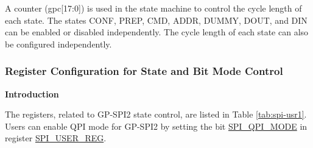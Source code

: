 \documentclass[main\_\_EN.tex]{subfiles}
\begin{document}
A counter (gpc[17:0]) is used in the state machine to control the cycle length of each state. The states CONF, PREP, CMD, ADDR, DUMMY, DOUT, and DIN can be enabled or disabled independently. The cycle length of each state can also be configured independently.

\subsubsection{Register Configuration for State and Bit Mode Control} \label{sec:gp-spi2-state-and-register-configuration}

\textbf{Introduction}

The registers, related to GP-SPI2 state control, are listed in Table \ref{tab:spi-usr1}. Users can enable QPI mode for GP-SPI2 by setting the bit \hyperref[fielddesc:SPIQPIMODE]{SPI\_QPI\_MODE} in register \hyperref[regdesc:SPIUSERREG]{SPI\_USER\_REG}.
\end{document}
